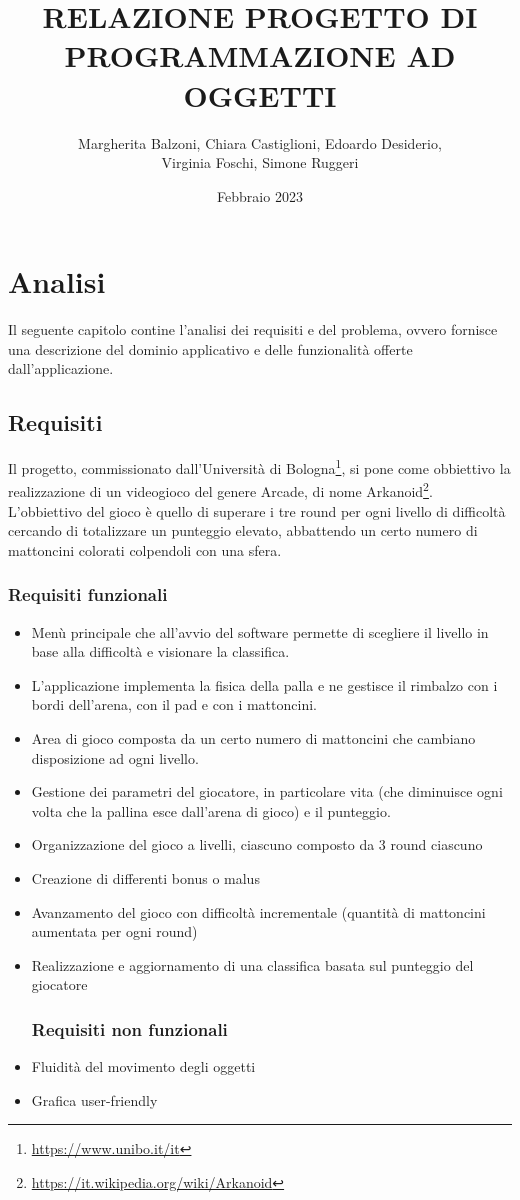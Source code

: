 \documentclass[a4paper,12pt]{report}
\title{RELAZIONE PROGETTO DI PROGRAMMAZIONE AD OGGETTI}
\author{Margherita Balzoni, Chiara Castiglioni, Edoardo Desiderio, \\Virginia Foschi, Simone Ruggeri}
\date{Febbraio 2023}
\begin{document}
\maketitle
\titlepage
\tableofcontents
\newpage

\chapter{Analisi}
Il seguente capitolo contine l'analisi dei requisiti e del problema, ovvero fornisce una descrizione del dominio applicativo e delle funzionalità offerte dall'applicazione.
\section{Requisiti}
Il progetto, commissionato dall'Università di Bologna\footnote{\url{https://www.unibo.it/it}}, si pone come obbiettivo la realizzazione di un videogioco del genere Arcade, di nome Arkanoid\footnote{\url{https://it.wikipedia.org/wiki/Arkanoid}}.\\L'obbiettivo del gioco è quello di superare i tre round per ogni livello di difficoltà cercando di totalizzare un punteggio elevato, abbattendo un certo numero di mattoncini colorati colpendoli con una sfera.
\\
\subsection*{Requisiti funzionali}
\begin{itemize}
  \item Menù principale che all'avvio del software permette di scegliere il livello in base alla difficoltà e visionare la classifica.
  \item L’applicazione implementa la fisica della palla e ne gestisce il rimbalzo con i bordi dell’arena, con il pad e con i mattoncini.
  \item Area di gioco composta da un certo numero di mattoncini che cambiano disposizione ad ogni livello.
  \item Gestione dei parametri del giocatore, in particolare vita (che diminuisce ogni volta che la pallina esce dall'arena di gioco) e il punteggio.
  \item Organizzazione del gioco a livelli, ciascuno composto da 3 round ciascuno
  \item Creazione di differenti bonus o malus
  \item Avanzamento del gioco con difficoltà incrementale (quantità di mattoncini aumentata per ogni round)
  \item Realizzazione e aggiornamento di una classifica basata sul punteggio del giocatore
        \subsection*{Requisiti non funzionali}
  \item Fluidità del movimento degli oggetti
  \item Grafica user-friendly
\end{itemize}
\end{document}
